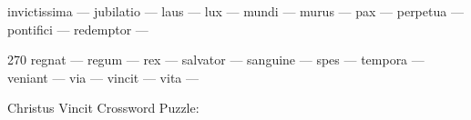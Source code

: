\documentclass[12pt]{article}
\begin{document}
\libertine
\pagestyle{fancy}
\fancyhf{}
\renewcommand{\headrulewidth}{0pt}
\renewcommand{\footrulewidth}{0pt}

\renewcommand\PuzzleClueFont{\rm\normalsize}
\noindent\begin{rotate}{0}
\small
\qquad invictissima --- jubilatio --- laus --- lux --- mundi --- murus --- pax --- perpetua --- pontifici --- redemptor --- 
\end{rotate}
\hfill
\begin{rotate}{270}
\small
regnat --- regum --- rex --- salvator --- sanguine --- spes --- tempora --- veniant --- via --- vincit --- vita --- 
\end{rotate}

\begin{center}
  \huge{Christus Vincit Crossword Puzzle:}
\end{center}
\vspace{1.5cm}
\end{document}
